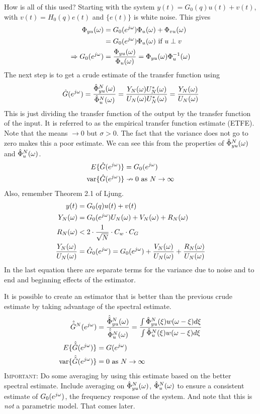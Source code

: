 How is all of this used? Starting with the system $y(t)=G_0(q)u(t)+v(t)$, with $v(t)=H_0(q)e(t)$ and $\{e(t)\}$ is white noise. This gives
\begin{align*}
\Phi_{yu}(\omega) &= G_0(e^{j\omega})\Phi_u(\omega) + \Phi_{vu}(\omega) \\
&= G_0(e^{j\omega})\Phi_u(\omega) \text{ if } u\perp v \\
\Rightarrow G_0(e^{j\omega}) &= \frac{\Phi_{yu}(\omega)}{\Phi_u(\omega)} = \Phi_{yu}(\omega)\Phi_u^{-1}(\omega)
\end{align*}
The next step is to get a crude estimate of the transfer function using
$$\hat{G}(e^{j\omega}) = \frac{\hat{\Phi}_{yu}^N(\omega)}{\hat{\Phi}_u^N(\omega)} = \frac{Y_N(\omega)U_N^*(\omega)}{U_N(\omega)U_N^*(\omega)} = \frac{Y_N(\omega)}{U_N(\omega)}$$
This is just dividing the transfer function of the output by the transfer function of the input. It is referred to as the empirical transfer function estimate (ETFE). Note that the means $\to 0$ but $\sigma>0$. The fact that the variance does not go to zero makes this a poor estimate. We can see this from the properties of $\hat{\Phi}_{yu}^N(\omega)$ and $\hat{\Phi}_u^N(\omega)$.
\begin{align*}
E\{\hat{G}(e^{j\omega})\} &= G_0(e^{j\omega}) \\
\text{var}\{\hat{G}(e^{j\omega})\} &\nrightarrow 0 \text{ as } N\to\infty
\end{align*}
Also, remember Theorem 2.1 of Ljung.
\begin{align*}
y(t) &= G_0(q)u(t) + v(t) \\
Y_N(\omega) &= G_0(e^{j\omega})U_N(\omega) + V_N(\omega) + R_N(\omega) \\
R_N(\omega) &< 2\cdot \frac{1}{\sqrt{N}}\cdot C_w\cdot C_G \\
\frac{Y_N(\omega)}{U_N(\omega)} &= \hat{G}_0(e^{j\omega}) = G_0(e^{j\omega}) + \frac{V_N(\omega)}{U_N(\omega)} + \frac{R_N(\omega)}{U_N(\omega)}
\end{align*}
In the last equation there are separate terms for the variance due to noise and to end and beginning effects of the estimator.

It is possible to create an estimator that is better than the previous crude estimate by taking advantage of the spectral estimate.
\begin{align*}
\hat{\hat{G}}^N(e^{j\omega}) &= \frac{\hat{\hat{\Phi}}_{yu}^N(\omega)}{\hat{\hat{\Phi}}_u^N(\omega)} = \frac{\int\hat{\Phi}_{yu}^N(\xi)w(\omega-\xi)d\xi}{\int \hat{\Phi}_u^N(\xi)w(\omega-\xi)d\xi} \\
E\{\hat{\hat{G}}(e^{j\omega})\} &= G(e^{j\omega}) \\
\text{var}\{\hat{\hat{G}}(e^{j\omega})\} &= 0 \text{ as } N\to\infty
\end{align*}
\textsc{Important:} Do some averaging by using this estimate based on the better spectral estimate. Include averaging on $\hat{\Phi}_{yu}^N(\omega)$, $\hat{\Phi}_u^N(\omega)$ to ensure a consistent estimate of $G_0(e^{j\omega})$, the frequency response of the system. And note that this is \textit{not} a parametric model. That comes later.

